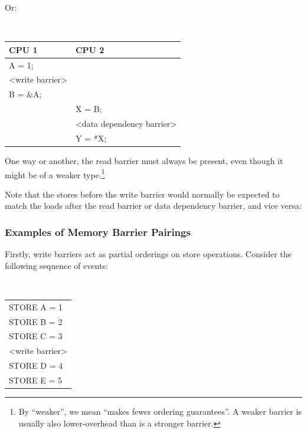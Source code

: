Or:

\vspace{5pt}
\begin{minipage}[t]{\columnwidth}
\tt
\scriptsize
\begin{tabular}{l|p{1.5in}}
	CPU 1 &		CPU 2 \\
	\hline
	A = 1; & \\
	<write barrier> & \\
	B = \&A; &	\\
		&	X = B; \\
		&	<data dependency barrier> \\
		&	Y = *X; \\
\end{tabular}
\end{minipage}
\vspace{5pt}

One way or another, the read barrier must always be present, even though
it might be of a weaker type.\footnote{
	By ``weaker'', we mean ``makes fewer ordering guarantees''.
	A weaker barrier is usually also lower-overhead than is a
	stronger barrier.}

Note that the stores before the write barrier would normally be expected to
match the loads after the read barrier or data dependency barrier, and vice
versa:

\begin{center}
\end{center}

\subsubsection{Examples of Memory Barrier Pairings}
\label{sec:advsync:Examples of Memory Barrier Pairings}

Firstly, write barriers act as partial orderings on store operations.
Consider the following sequence of events:

\vspace{5pt}
\begin{minipage}[t]{\columnwidth}
\tt
\scriptsize
\begin{tabular}{l}
	STORE A = 1 \\
	STORE B = 2 \\
	STORE C = 3 \\
	<write barrier> \\
	STORE D = 4 \\
	STORE E = 5 \\
\end{tabular}
\end{minipage}
\vspace{5pt}

